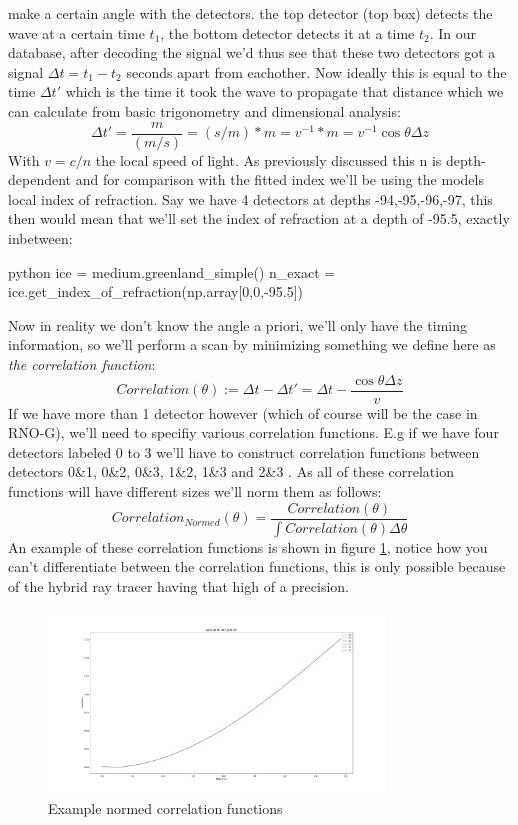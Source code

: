\documentclass[11pt,a4paper,faculty=we,language=en,doctype=report]{cls/ugent-doc}
\begin{document}
make a certain angle with the detectors. the top detector (top box)
detects the wave at a certain time $t_1$, the bottom detector
detects it at a time $t_2$. In our database, after decoding the
signal we'd thus see that these two detectors got a signal $\Delta t
= t_1 - t_2$ seconds apart from eachother. Now ideally this is
equal to the time $\Delta t'$ which is the time it took the wave
to propagate that distance which we can calculate from 
basic trigonometry and dimensional analysis:
\begin{equation}
	\Delta t' = \frac{m}{(m/s)} = (s/m)*m = v^{-1} * m = v^{-1} \cos\theta \Delta z
\end{equation}
With $v = c/n$ the local speed of light. As previously discussed this n is
depth-dependent and for comparison with the fitted index we'll be using the
models local index of refraction. Say we have 4 detectors at depths -94,-95,-96,-97,
this then would mean that we'll set the index of refraction at a depth of -95.5, 
exactly inbetween:
\begin{mintedbox}{python}
ice = medium.greenland_simple()
n_exact = ice.get_index_of_refraction(np.array[0,0,-95.5])
\end{mintedbox}
Now in reality we don't know the angle a priori, we'll only have the timing
information, so we'll perform a scan by minimizing something we define here as 
\textit{the correlation function}:
\begin{equation}
	Correlation(\theta) := \Delta t - \Delta t' = \Delta t
	- \frac{\cos\theta \Delta z}{v}
  \label{eqn:PlaneWave}
\end{equation}
If we have more than 1 detector however (which of course will be the case in RNO-G),
we'll need to specifiy various correlation functions.
E.g if we have four detectors labeled 0 to 3 we'll have to construct
correlation functions between detectors 0\&1, 0\&2, 0\&3, 1\&2, 1\&3 and 2\&3 .
As all of these correlation functions will have different
sizes we'll norm them as follows:
\begin{equation}
	Correlation_{Normed}(\theta) =
	\frac{Correlation(\theta)}{\int Correlation(\theta)\Delta
	\theta}
\end{equation}
An example of these correlation functions is shown in figure \ref{fig:NormedCorrelation}, 
notice how you can't differentiate between the correlation functions, this is only possible
because of the hybrid ray tracer having that high of a precision.
\begin{figure}
	\centering
	\includegraphics[width=0.8\textwidth]{NormedCorrelation.pdf}
	\caption{Example normed correlation functions}
	\label{fig:NormedCorrelation}
\end{figure}
\end{document}

